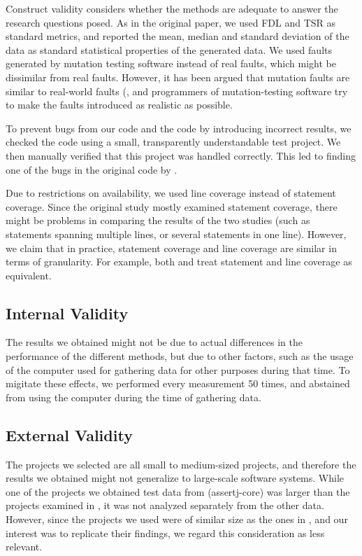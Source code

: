 Construct validity considers whether the methods are adequate to answer
the research questions posed. As in the original paper, we used FDL
and TSR as standard metrics, and reported the mean, median and standard
deviation of the data as standard statistical properties of the generated
data. We used faults generated by mutation testing software instead of
real faults, which might be dissimilar from real faults. However, it
has been argued that mutation faults are similar to real-world faults
(\cite{budd1980mutation}, and programmers of mutation-testing software
try to make the faults introduced as realistic as possible.

To prevent bugs from our code and the code by \cite{cruciani2019scalable}
introducing incorrect results, we checked the code using a small,
transparently understandable test project. We then manually verified
that this project was handled correctly. This led to finding one of
the bugs in the original code by \cite{cruciani2019scalable}.

Due to restrictions on availability, we used line coverage instead of
statement coverage. Since the original study mostly examined statement
coverage, there might be problems in comparing the results of the two
studies (such as statements spanning multiple lines, or several statements
in one line). However, we claim that in practice, statement coverage
and line coverage are similar in terms of granularity.  For example,
both \cite{an2018comparing} and \cite{yang2009survey} treat statement
and line coverage as equivalent.

\subsection{Internal Validity}

The results we obtained might not be due to actual differences in
the performance of the different methods, but due to other factors,
such as the usage of the computer used for gathering data for other
purposes during that time. To migitate these effects, we performed every
measurement 50 times, and abstained from using the computer during the
time of gathering data.


\subsection{External Validity}

The projects we selected are all small to medium-sized projects,
and therefore the results we obtained might not generalize to
large-scale software systems. While one of the projects we obtained
test data from (assertj-core) was larger than the projects examined in
\cite{cruciani2019scalable}, it was not analyzed separately from the
other data. However, since the projects we used were of similar size
as the ones in \cite{cruciani2019scalable}, and our interest was to
replicate their findings, we regard this consideration as less relevant.
